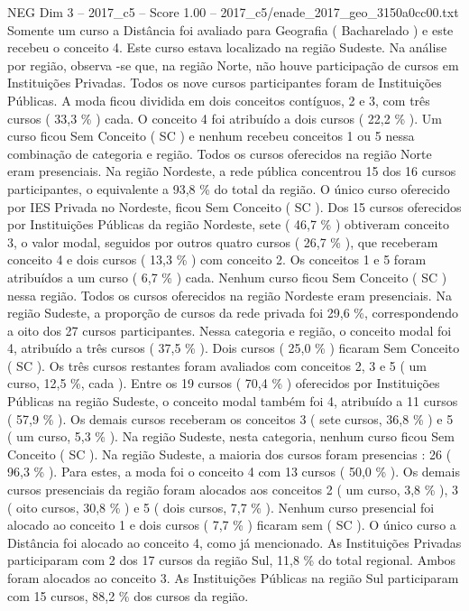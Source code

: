 \begin{textsample}{NEG Dim 3 – 2017\_c5 – Score 1.00 – 2017\_c5/enade\_2017\_geo\_3150a0cc00.txt}
Somente um curso a Distância foi avaliado para Geografia ( Bacharelado ) e este recebeu o conceito 4.
Este curso estava localizado na região Sudeste.
Na análise por região, observa -se que, na região Norte, não houve participação de cursos em Instituições Privadas.
Todos os nove cursos participantes foram de Instituições Públicas.
A moda ficou dividida em dois conceitos contíguos, 2 e 3, com três cursos ( 33,3 \% ) cada.
O conceito 4 foi atribuído a dois cursos ( 22,2 \% ).
Um curso ficou Sem Conceito ( SC ) e nenhum recebeu conceitos 1 ou 5 nessa combinação de categoria e região.
Todos os cursos oferecidos na região Norte eram presenciais.
Na região Nordeste, a rede pública concentrou 15 dos 16 cursos participantes, o equivalente a 93,8 \% do total da região.
O único curso oferecido por IES Privada no Nordeste, ficou Sem Conceito ( SC ).
Dos 15 cursos oferecidos por Instituições Públicas da região Nordeste, sete ( 46,7 \% ) obtiveram conceito 3, o valor modal, seguidos por outros quatro cursos ( 26,7 \% ), que receberam conceito 4 e dois cursos ( 13,3 \% ) com conceito 2.
Os conceitos 1 e 5 foram atribuídos a um curso ( 6,7 \% ) cada.
Nenhum curso ficou Sem Conceito ( SC ) nessa região.
Todos os cursos oferecidos na região Nordeste eram presenciais.
Na região Sudeste, a proporção de cursos da rede privada foi 29,6 \%, correspondendo a oito dos 27 cursos participantes.
Nessa categoria e região, o conceito modal foi 4, atribuído a três cursos ( 37,5 \% ).
Dois cursos ( 25,0 \% ) ficaram Sem Conceito ( SC ).
Os três cursos restantes foram avaliados com conceitos 2, 3 e 5 ( um curso, 12,5 \%, cada ).
Entre os 19 cursos ( 70,4 \% ) oferecidos por Instituições Públicas na região Sudeste, o conceito modal também foi 4, atribuído a 11 cursos ( 57,9 \% ).
Os demais cursos receberam os conceitos 3 ( sete cursos, 36,8 \% ) e 5 ( um curso, 5,3 \% ).
Na região Sudeste, nesta categoria, nenhum curso ficou Sem Conceito ( SC ).
Na região Sudeste, a maioria dos cursos foram presencias : 26 ( 96,3 \% ).
Para estes, a moda foi o conceito 4 com 13 cursos ( 50,0 \% ).
Os demais cursos presenciais da região foram alocados aos conceitos 2 ( um curso, 3,8 \% ), 3 ( oito cursos, 30,8 \% ) e 5 ( dois cursos, 7,7 \% ).
Nenhum curso presencial foi alocado ao conceito 1 e dois cursos ( 7,7 \% ) ficaram sem ( SC ).
O único curso a Distância foi alocado ao conceito 4, como já mencionado.
As Instituições Privadas participaram com 2 dos 17 cursos da região Sul, 11,8 \% do total regional.
Ambos foram alocados ao conceito 3.
As Instituições Públicas na região Sul participaram com 15 cursos, 88,2 \% dos cursos da região.

\end{textsample}
